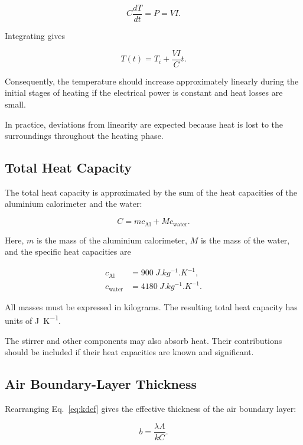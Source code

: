 \documentclass[12pt,a4paper]{article}
\begin{document}
\[
C\frac{dT}{dt}=P=VI.
\]

Integrating gives

\[
\boxed{
T(t)=T_i+\frac{VI}{C}t
}.
\]
    
Consequently, the temperature should increase approximately
linearly during the initial stages of heating if the electrical
power is constant and heat losses are small.

In practice, deviations from linearity are expected because heat
is lost to the surroundings throughout the heating phase.

\subsection{Total Heat Capacity}

The total heat capacity is approximated by the sum of the heat
capacities of the aluminium calorimeter and the water:

\begin{equation}
    \boxed{
    C=mc_{\mathrm{Al}}+Mc_{\mathrm{water}}
    }.
    \label{eq:heatcapacity}
\end{equation}

Here, $m$ is the mass of the aluminium calorimeter, $M$ is the
mass of the water, and the specific heat capacities are

\begin{align}
    c_{\mathrm{Al}} &=
    \SI{900}{J.kg^{-1}.K^{-1}},\\
    c_{\mathrm{water}} &=
    \SI{4180}{J.kg^{-1}.K^{-1}}.
\end{align}

All masses must be expressed in kilograms. The resulting total
heat capacity has units of \si{J.K^{-1}}.

The stirrer and other components may also absorb heat. Their
contributions should be included if their heat capacities are
known and significant.

\subsection{Air Boundary-Layer Thickness}

Rearranging Eq.~\eqref{eq:kdef} gives the effective thickness of
the air boundary layer:

\begin{equation}
    \boxed{
    b=\frac{\lambda A}{kC}
    }.
    \label{eq:thickness}
\end{equation}
\end{document}

